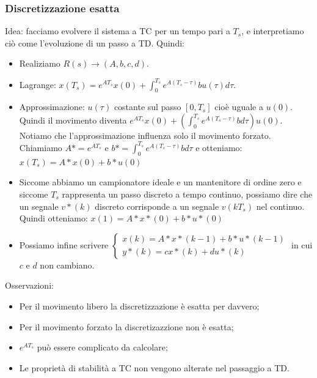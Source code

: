     \subsubsection{Discretizzazione esatta}
    Idea: facciamo evolvere il sistema a TC per un tempo pari a $T_s$, e interpretiamo ciò come l'evoluzione di un passo a TD.\newline
    Quindi:
    \begin{itemize}
        \item Realiziamo $R(s) \rightarrow (A,b,c,d)$.
        \item Lagrange: $x(T_s) = e^{AT_s} x(0) + \int_{0}^{T_s} e^{A(T_s-\tau)} b u(\tau) d \tau$.
        \item Approssimazione: $u(\tau)$ costante sul passo $[0, T_s]$ cioè uguale a $u(0)$. Quindi il movimento diventa $e^{AT_s} x(0) + \left(\int_{0}^{T_s} e^{A(T_s-\tau)} b d \tau\right) u(0)$. Notiamo che l'approssimazione influenza solo il movimento forzato. Chiamiamo $A* = e^{AT_s}$ e $b* = \int_{0}^{T_s} e^{A(T_s-\tau)} b d \tau$ e otteniamo:\newline
        $x(T_s) = A* x(0) + b* u(0)$
        \item Siccome abbiamo un campionatore ideale e un mantenitore di ordine zero e siccome $T_s$ rappresenta un passo discreto a tempo continuo, possiamo dire che un segnale $v*(k)$ discreto corrisponde a un segnale $v(kT_s)$ nel continuo. Quindi otteniamo:\newline
        $x(1) = A* x*(0) + b* u*(0)$
        \item Possiamo infine scrivere $\begin{cases}
            x(k) = A* x*(k-1) + b* u*(k-1)\\
            y*(k) = c x*(k) + d u*(k)
        \end{cases}$ in cui $c$ e $d$ non cambiano.
    \end{itemize}
    Osservazioni:
    \begin{itemize}
        \item Per il movimento libero la discretizzazione è esatta per davvero;
        \item Per il movimento forzato la discretizazzione non è esatta;
        \item $e^{AT_s}$ può essere complicato da calcolare;
        \item Le proprietà di stabilità a TC non vengono alterate nel passaggio a TD.
    \end{itemize}

